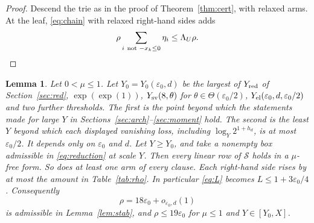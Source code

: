 \documentclass{amsart}
\newtheorem{lemma}{Lemma}[section]
\theoremstyle{definition}
\theoremstyle{plain}
\numberwithin{equation}{section}
\numberwithin{table}{section}
\begin{document}
\begin{proof}
Descend the trie as in the proof of Theorem~\ref{thm:cert}, with relaxed
arms. At the leaf, \eqref{eq:chain} with relaxed right-hand sides adds
\[
 \rho\sum_{i\ \text{not }-x_k\le0}\eta_i\le\Lambda_U\rho . \qedhere
\]
\end{proof}

\begin{lemma}\label{lem:endpoint}
Let $0<\mu\le1$. Let $Y_0=Y_0(\varepsilon_0,d)$ be the largest of
$Y_{\rm red}$ of Section~\ref{sec:red}, $\exp(\exp(1))$,
$Y_{\rm sv}(8,\theta)$ for $\theta\in\Theta(\varepsilon_0/2)$,
$Y_{\rm el}(\varepsilon_0,d,\varepsilon_0/2)$ and two further thresholds. The
first is the point beyond which the statements made for large $Y$ in
Sections~\ref{sec:arch}--\ref{sec:moment} hold. The second is the least $Y$
beyond which each displayed vanishing loss, including $\log_Y2^{1+h_d}$, is at
most $\varepsilon_0/2$. It depends only on
$\varepsilon_0$ and $d$. Let $Y\ge Y_0$, and take a
nonempty box admissible in \eqref{eq:reduction} at scale $Y$. Then every
linear row of $\mathcal S$ holds in a $\mu$-free form. So does at least one
arm of every clause. Each right-hand side rises by at
most the amount in Table~\ref{tab:rho}. In
particular \eqref{eq:L} becomes $L\le1+3\varepsilon_0/4$. Consequently
\begin{equation}\label{eq:rho}
 \rho=18\varepsilon_0+o_{\varepsilon_0,d}(1)
\end{equation}
is admissible in Lemma~\ref{lem:stab}, and $\rho\le19\varepsilon_0$ for
$\mu\le1$ and $Y\in[Y_0,X]$.
\end{lemma}
\end{document}
